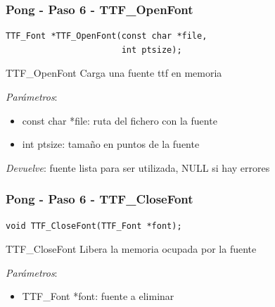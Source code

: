 \begin{frame}[fragile]
    \frametitle{Pong - Paso 6 - TTF\_OpenFont}
	
\begin{verbatim}
TTF_Font *TTF_OpenFont(const char *file,
                       int ptsize);
\end{verbatim}

    \begin{block}{TTF\_OpenFont}
	Carga una fuente ttf en memoria
	
	\emph{Parámetros}:
	\begin{itemize}
	    \item const char *file: ruta del fichero con la fuente
	    \item int ptsize: tamaño en puntos de la fuente
	\end{itemize}
	
	\emph{Devuelve}: fuente lista para ser utilizada, NULL si hay errores

    \end{block}

\end{frame}

\begin{frame}[fragile]
    \frametitle{Pong - Paso 6 - TTF\_CloseFont}
	
\begin{verbatim}
void TTF_CloseFont(TTF_Font *font);
\end{verbatim}

    \begin{block}{TTF\_CloseFont}
	Libera la memoria ocupada por la fuente
	
	\emph{Parámetros}:
	\begin{itemize}
	    \item TTF\_Font *font: fuente a eliminar
	\end{itemize}

    \end{block}

\end{frame}

